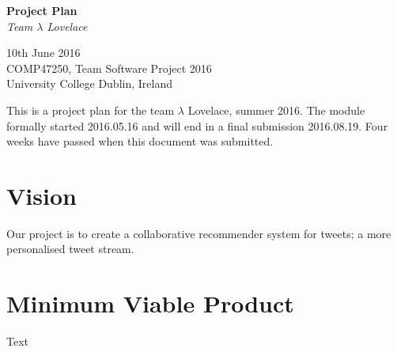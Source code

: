 \documentclass{article}
\begin{document}
\begin{center}
	{\LARGE \textbf{Project Plan}} \\
	\vspace{0.5em}
	\textsl{Team $\lambda$ Lovelace}
\end{center}

\vspace{0.5em}

\begin{center}
	10th June 2016 \\
	COMP47250, Team Software Project 2016 \\ 
	University College Dublin, Ireland \\
\end{center}

\vspace{0.5em}


\noindent This is a project plan for the team $\lambda$ Lovelace, summer 2016. The module formally started 2016.05.16 and will end in a final submission 2016.08.19. Four weeks have passed when this document was submitted. 


\section{Vision}
% 

Our project is to create a collaborative recommender system for tweets; a more personalised tweet stream.


\section{Minimum Viable Product}
% 

Text
\end{document}
